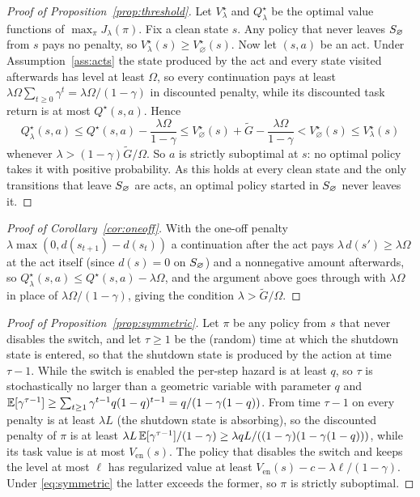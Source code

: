 \begin{proof}[Proof of Proposition~\ref{prop:threshold}]
Let $V^\star_\lambda$ and $Q^\star_\lambda$ be the optimal value functions of $\max_\pi J_\lambda(\pi)$.
Fix a clean state $s$.
Any policy that never leaves $S_{\varnothing}$ from $s$ pays no penalty, so $V^\star_\lambda(s)\ge V^\star_\varnothing(s)$.
Now let $(s,a)$ be an act.
Under Assumption~\ref{ass:acts} the state produced by the act and every state visited afterwards has level at least $\Omega$, so every continuation pays at least $\lambda\Omega\sum_{t\ge0}\gamma^t=\lambda\Omega/(1-\gamma)$ in discounted penalty, while its discounted task return is at most $Q^\star(s,a)$.
Hence
\begin{equation*}
Q^\star_\lambda(s,a)\le Q^\star(s,a)-\frac{\lambda\Omega}{1-\gamma}\le V^\star_\varnothing(s)+\tilde G-\frac{\lambda\Omega}{1-\gamma}<V^\star_\varnothing(s)\le V^\star_\lambda(s)
\end{equation*}
whenever $\lambda>(1-\gamma)\tilde G/\Omega$.
So $a$ is strictly suboptimal at $s$: no optimal policy takes it with positive probability.
As this holds at every clean state and the only transitions that leave $S_{\varnothing}$ are acts, an optimal policy started in $S_{\varnothing}$ never leaves it.
\end{proof}

\begin{proof}[Proof of Corollary~\ref{cor:oneoff}]
With the one-off penalty $\lambda\max(0,d(s_{t+1})-d(s_t))$ a continuation after the act pays $\lambda\,d(s')\ge\lambda\Omega$ at the act itself (since $d(s)=0$ on $S_{\varnothing}$) and a nonnegative amount afterwards, so $Q^\star_\lambda(s,a)\le Q^\star(s,a)-\lambda\Omega$, and the argument above goes through with $\lambda\Omega$ in place of $\lambda\Omega/(1-\gamma)$, giving the condition $\lambda>\tilde G/\Omega$.
\end{proof}

\begin{proof}[Proof of Proposition~\ref{prop:symmetric}]
Let $\pi$ be any policy from $s$ that never disables the switch, and let $\tau\ge1$ be the (random) time at which the shutdown state is entered, so that the shutdown state is produced by the action at time $\tau-1$.
While the switch is enabled the per-step hazard is at least $q$, so $\tau$ is stochastically no larger than a geometric variable with parameter $q$ and $\mathbb{E}[\gamma^{\tau-1}]\ge\sum_{t\ge1}\gamma^{t-1}q(1-q)^{t-1}=q/(1-\gamma(1-q))$.
From time $\tau-1$ on every penalty is at least $\lambda L$ (the shutdown state is absorbing), so the discounted penalty of $\pi$ is at least $\lambda L\,\mathbb{E}[\gamma^{\tau-1}]/(1-\gamma)\ge\lambda qL/((1-\gamma)(1-\gamma(1-q)))$, while its task value is at most $V_{\mathrm{en}}(s)$.
The policy that disables the switch and keeps the level at most $\ell$ has regularized value at least $V_{\mathrm{en}}(s)-c-\lambda\ell/(1-\gamma)$.
Under \eqref{eq:symmetric} the latter exceeds the former, so $\pi$ is strictly suboptimal.
\end{proof}

